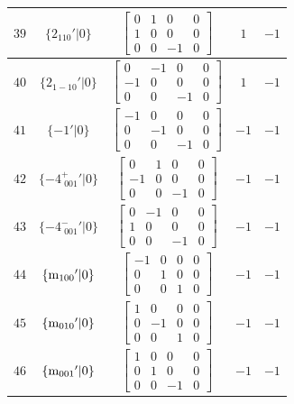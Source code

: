 \documentclass[fleqn,8pt]{jsarticle}
\begin{document}
\begin{longtable}{ccccc}
$ 39 $ & $ \{2{}_{110}{}'|0\} $ & $ \begin{bmatrix} 0 & 1 & 0 & 0 \\ 1 & 0 & 0 & 0 \\ 0 & 0 & -1 & 0 \end{bmatrix} $ & $ 1 $ & $ -1 $ \\ \hline
$ 40 $ & $ \{2{}_{1-10}{}'|0\} $ & $ \begin{bmatrix} 0 & -1 & 0 & 0 \\ -1 & 0 & 0 & 0 \\ 0 & 0 & -1 & 0 \end{bmatrix} $ & $ 1 $ & $ -1 $ \\ \hline
$ 41 $ & $ \{-1{}'|0\} $ & $ \begin{bmatrix} -1 & 0 & 0 & 0 \\ 0 & -1 & 0 & 0 \\ 0 & 0 & -1 & 0 \end{bmatrix} $ & $ -1 $ & $ -1 $ \\ \hline
$ 42 $ & $ \{-4^{+}_{\,\,001}{}'|0\} $ & $ \begin{bmatrix} 0 & 1 & 0 & 0 \\ -1 & 0 & 0 & 0 \\ 0 & 0 & -1 & 0 \end{bmatrix} $ & $ -1 $ & $ -1 $ \\ \hline
$ 43 $ & $ \{-4^{-}_{\,\,001}{}'|0\} $ & $ \begin{bmatrix} 0 & -1 & 0 & 0 \\ 1 & 0 & 0 & 0 \\ 0 & 0 & -1 & 0 \end{bmatrix} $ & $ -1 $ & $ -1 $ \\ \hline
$ 44 $ & $ \{{\rm m}_{100}{}'|0\} $ & $ \begin{bmatrix} -1 & 0 & 0 & 0 \\ 0 & 1 & 0 & 0 \\ 0 & 0 & 1 & 0 \end{bmatrix} $ & $ -1 $ & $ -1 $ \\ \hline
$ 45 $ & $ \{{\rm m}_{010}{}'|0\} $ & $ \begin{bmatrix} 1 & 0 & 0 & 0 \\ 0 & -1 & 0 & 0 \\ 0 & 0 & 1 & 0 \end{bmatrix} $ & $ -1 $ & $ -1 $ \\ \hline
$ 46 $ & $ \{{\rm m}_{001}{}'|0\} $ & $ \begin{bmatrix} 1 & 0 & 0 & 0 \\ 0 & 1 & 0 & 0 \\ 0 & 0 & -1 & 0 \end{bmatrix} $ & $ -1 $ & $ -1 $ \\ \hline

\end{longtable}
\end{document}

